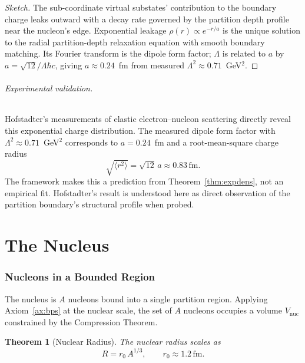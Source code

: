 \documentclass[11pt,a4paper]{article}
\newtheorem{theorem}{Theorem}[section]
\theoremstyle{definition}
\theoremstyle{remark}
\begin{document}
\begin{proof}[Sketch]
The sub-coordinate virtual substates' contribution to the boundary charge leaks outward with a decay rate governed by the partition depth profile near the nucleon's edge. Exponential leakage $\rho(r)\propto e^{-r/a}$ is the unique solution to the radial partition-depth relaxation equation with smooth boundary matching. Its Fourier transform is the dipole form factor; $\Lambda$ is related to $a$ by $a = \sqrt{12}/\Lambda\hbar c$, giving $a\approx 0.24$~fm from measured $\Lambda^2 \approx 0.71$~GeV$^2$.
\end{proof}

\paragraph{Experimental validation.} Hofstadter's measurements \citep{hofstadter1953, hofstadter1956} of elastic electron--nucleon scattering directly reveal this exponential charge distribution. The measured dipole form factor with $\Lambda^2 \approx 0.71$~GeV$^2$ corresponds to $a = 0.24$~fm and a root-mean-square charge radius
\[
\sqrt{\langle r^2\rangle} = \sqrt{12}\,a \approx 0.83\,\mathrm{fm}.
\]
The framework makes this a prediction from Theorem~\ref{thm:expdens}, not an empirical fit. Hofstadter's result is understood here as direct observation of the partition boundary's structural profile when probed.

\part{The Nucleus}

\section{Nucleons in a Bounded Region}
\label{sec:boundnuc}

The nucleus is $A$ nucleons bound into a single partition region. Applying Axiom~\ref{ax:bps} at the nuclear scale, the set of $A$ nucleons occupies a volume $V_{\mathrm{nuc}}$ constrained by the Compression Theorem.

\begin{theorem}[Nuclear Radius]
\label{thm:nucradius}
The nuclear radius scales as
\[
R = r_0\, A^{1/3},\qquad r_0 \approx 1.2\,\mathrm{fm}.
\]
\end{theorem}
\end{document}
